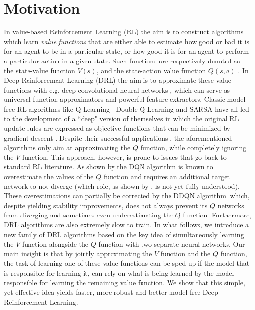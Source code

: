 \section{Motivation}
\label{sec:ijcnn_introduction}

In value-based Reinforcement Learning (RL) the aim is to construct algorithms which learn \textit{value functions} that are either able to estimate how good or bad it is for an agent to be in a particular state, or how good it is for an agent to perform a particular action in a given state. Such functions are respectively denoted as the state-value function $V(s)$, and the state-action value function $Q(s,a)$ \cite{sutton2018reinforcement}. In Deep Reinforcement Learning (DRL) the aim is to approximate these value functions with e.g. deep convolutional neural networks \cite{lecun2015deep}, which can serve as universal function approximators and powerful feature extractors. Classic model-free RL algorithms like Q-Learning \cite{watkins1992q}, Double Q-Learning \cite{hasselt2010double} and SARSA \cite{rummery1994line} have all led to the development of a ``deep" version of themselves in which the original RL update rules are expressed as objective functions that can be minimized by gradient descent \cite{mnih2015human, van2016deep, zhao2016deep}. Despite their successful applications \cite{li2017deep}, the aforementioned algorithms only aim at approximating the $Q$ function, while completely ignoring the $V$ function. This approach, however, is prone to issues that go back to standard RL literature. As shown by \citet{van2016deep} the DQN algorithm \cite{mnih2015human} is known to overestimate the values of the $Q$ function and requires an additional target network to not diverge (which role, as shown by \citet{achiam2019towards}, is not yet fully understood). These overestimations can partially be corrected by the DDQN \cite{van2016deep} algorithm, which, despite yielding stability improvements, does not always prevent its $Q$ networks from diverging \cite{van2018deep} and sometimes even underestimating the $Q$ function. Furthermore, DRL algorithms are also extremely slow to train. In what follows, we introduce a new family of DRL algorithms based on the key idea of simultaneously learning the $V$ function alongside the $Q$ function with two separate neural networks. Our main insight is that by jointly approximating the $V$ function and the $Q$ function, the task of learning one of these value functions can be sped up if the model that is responsible for learning it, can rely on what is being learned by the model responsible for learning the remaining value function. We show that this simple, yet effective idea yields faster, more robust and better model-free Deep Reinforcement Learning.


